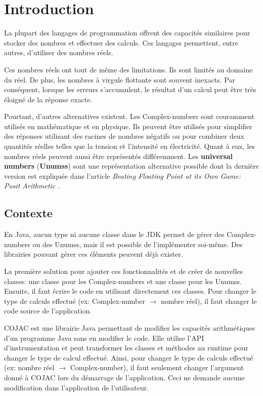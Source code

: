 \chapter{Introduction}

La plupart des langages de programmation offrent des capacités similaires pour stocker des nombres et effectuer des calculs. Ces langages permettent, entre autres, d'utiliser  des nombres réels.

Ces nombres réels ont tout de même des limitations. Ils sont limités au domaine du réel. De plus, les nombres à virgule flottante sont souvent inexacts. Par conséquent, lorsque les erreurs s'accumulent, le résultat d'un calcul peut être très éloigné de la réponse exacte.

Pourtant, d'autres alternatives existent. Les \glspl{Complex-number} sont couramment utilisés en mathématique et en physique. Ils peuvent être utilisés pour simplifier des réponses utilisant des racines de nombres négatifs ou pour combiner deux quantités réelles telles que la tension et l'intensité en électricité. Quant à eux, les nombres réels peuvent aussi être représentés différemment. Les \textbf{universal numbers} (\textbf{\glspl{Unums}}) sont une représentation alternative possible dont la dernière version est expliquée dans l'article \textit{Beating Floating Point at its Own Game: Posit Arithmetic} \cite{posit}.


\section{Contexte}

En Java, aucun type ni aucune classe dans le \gls{JDK} permet de gérer des \glspl{Complex-number} ou des \glspl{Unums}, mais il est possible de l'implémenter soi-même. Des librairies pouvant gérer ces éléments peuvent déjà exister.

La première solution pour ajouter ces fonctionnalités et de créer de nouvelles classes: une classe pour les \glspl{Complex-number} et une classe pour les \glspl{Unums}. Ensuite, il faut écrire le code en utilisant directement ces classes. Pour changer le type de calculs effectué (ex: \gls{Complex-number} $\rightarrow$ nombre réel), il faut changer le code source de l'application.

\gls{COJAC} \cite{COJAC} est une librairie Java permettant de modifier les capacités arithmétiques d'un programme Java sans en modifier le code. Elle utilise l'API d'instrumentation et peut transformer les classes et méthodes au runtime pour changer le type de calcul effectué. Ainsi, pour changer le type de calculs effectué (ex: nombre réel $\rightarrow$ \gls{Complex-number}), il faut seulement changer l'argument donné à \gls{COJAC} lors du démarrage de l'application. Ceci ne demande aucune modification dans l'application de l'utilisateur.

